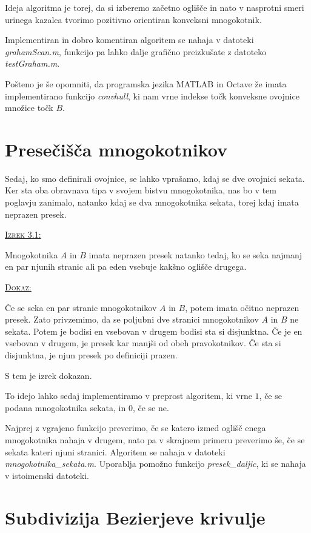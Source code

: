 \documentclass[a4paper, 12pt]{article} %
\newenvironment{matematika}[1]{
{\underline{\textsc{#1:}}}
}{
}
\begin{document}
Ideja algoritma je torej, da si izberemo začetno oglišče in nato v nasprotni smeri urinega kazalca tvorimo pozitivno orientiran konveksni mnogokotnik.

Implementiran in dobro komentiran algoritem se nahaja v datoteki \emph{grahamScan.m}, funkcijo pa lahko dalje grafično preizkušate z datoteko \emph{testGraham.m}.

Pošteno je še opomniti, da programska jezika MATLAB in Octave že imata implementirano funkcijo \emph{convhull}, ki nam vrne indekse točk konveksne ovojnice množice točk $B$.

\section{Presečišča mnogokotnikov}

Sedaj, ko smo definirali ovojnice, se lahko vprašamo, kdaj se dve ovojnici sekata. Ker sta oba obravnava tipa v svojem bistvu mnogokotnika, nas bo v tem poglavju zanimalo, natanko kdaj se dva mnogokotnika sekata, torej kdaj imata neprazen presek.

\begin{matematika}{Izrek 3.1}
Mnogokotnika $A$ in $B$ imata neprazen presek natanko tedaj, ko se seka najmanj en par njunih stranic ali pa eden vsebuje kakšno oglišče drugega.
\end{matematika}

\begin{matematika}{Dokaz}
Če se seka en par stranic mnogokotnikov $A$ in $B$, potem imata očitno neprazen presek.
Zato privzemimo, da se poljubni dve stranici mnogokotnikov $A$ in $B$ ne sekata. Potem je bodisi en vsebovan v drugem bodisi sta si disjunktna. Če je en vsebovan v drugem, je presek kar manjši od obeh pravokotnikov. Če sta si disjunktna, je njun presek po definiciji prazen.

S tem je izrek dokazan.
\end{matematika}

To idejo lahko sedaj implementiramo v preprost algoritem, ki vrne $1$, če se podana mnogokotnika sekata, in $0$, če se ne.

Najprej z vgrajeno funkcijo preverimo, če se katero izmed oglišč enega mnogokotnika nahaja v drugem, nato pa v skrajnem primeru preverimo še, če se sekata kateri njuni stranici. Algoritem se nahaja v datoteki \emph{mnogokotnika\_sekata.m}. Uporablja pomožno funkcijo \emph{presek\_daljic}, ki se nahaja v istoimenski datoteki.

\section{Subdivizija Bezierjeve krivulje}
\end{document}
